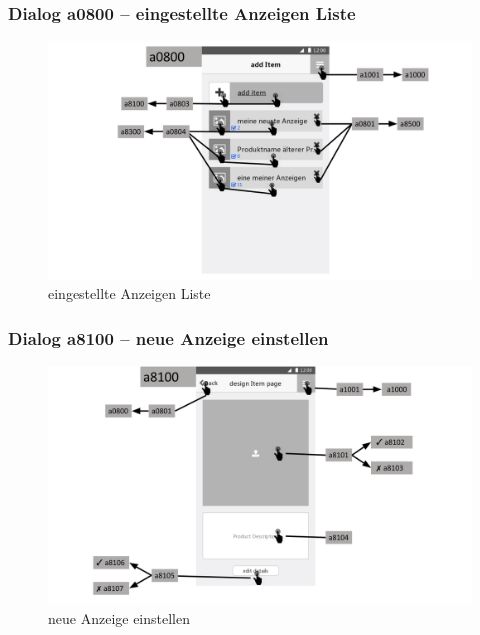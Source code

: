 \documentclass[a4paper,12pt,oneside]{scrartcl}
\begin{document}
\subsubsection{Dialog a0800 – eingestellte Anzeigen Liste}
\begin{figure}[!htbp]
\centering
\noindent\includegraphics[width=\linewidth,height=\textheight,keepaspectratio]{Dialoge/a0800}
\caption{eingestellte Anzeigen Liste}
\end{figure}
\FloatBarrier

\subsubsection{Dialog a8100 – neue Anzeige einstellen }
\begin{figure}[!htbp]
\centering
\noindent\includegraphics[width=\linewidth,height=\textheight,keepaspectratio]{Dialoge/a8100}
\caption{neue Anzeige einstellen}
\end{figure}
\FloatBarrier
\end{document}
